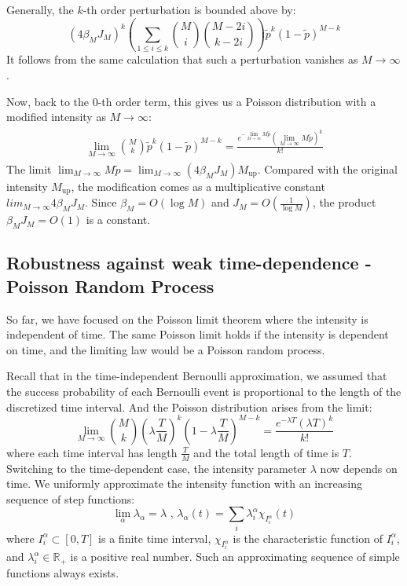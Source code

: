 \documentclass[a4paper,11pt]{article}
\theoremstyle{definition}
\numberwithin{equation}{section}
\begin{document}
Generally, the $k$-th order perturbation is bounded above by:
\begin{equation}
    (4\beta_M J_M)^k(\sum_{1\leq i\leq k}\binom{M}{i}\binom{M- 2i}{k - 2i})\widetilde{p}^k(1 - \widetilde{p})^{M - k}
\end{equation}
It follows from the same calculation that such a perturbation vanishes as $M\rightarrow\infty$.

Now, back to the $0$-th order term, this gives us a Poisson distribution with a modified intensity as $M\rightarrow\infty$:
\begin{align}
    \begin{split}
        \lim_{M\rightarrow\infty}\binom{M}{k}\widetilde{p}^k(1 - \widetilde{p})^{M - k} = \frac{e^{-\lim_{M\rightarrow\infty}M\widetilde{p}}(\lim_{M\rightarrow\infty}M\widetilde{p})^k}{k!}
    \end{split}
\end{align}
The limit $\lim_{M\rightarrow \infty}M\widetilde{p} = \lim_{M\rightarrow\infty}(4\beta_M J_M)M_\text{up}$. Compared with the original intensity $M_\text{up}$, the modification comes as a multiplicative constant $lim_{M\rightarrow\infty}4\beta_M J_M$. Since $\beta_M = O(\log M)$ and $J_M = O(\frac{1}{\log M})$, the product $\beta_M J_M = O(1)$ is a constant.
\subsection{Robustness against weak time-dependence - Poisson Random Process}
So far, we have focused on the Poisson limit theorem where the intensity is independent of time. The same Poisson limit holds if the intensity is dependent on time, and the limiting law would be a Poisson random process.

Recall that in the time-independent Bernoulli approximation, we assumed that the success probability of each Bernoulli event is proportional to the length of the discretized time interval. And the Poisson distribution arises from the limit:
\begin{equation}
    \lim_{M\rightarrow\infty}\binom{M}{k}(\lambda\frac{T}{M})^k(1 - \lambda\frac{T}{M})^{M-k} = \frac{e^{-\lambda T}(\lambda T)^k}{k!}
\end{equation}
where each time interval has length $\frac{T}{M}$ and the total length of time is $T$. Switching to the time-dependent case, the intensity parameter $\lambda$ now depends on time. We uniformly approximate the intensity function with an increasing sequence of step functions:
\begin{equation}
    \lim_{\alpha}\lambda_\alpha = \lambda\text{ , }\lambda_\alpha(t) = \sum_{i}\lambda^\alpha_i\chi_{I_i^\alpha}(t)
\end{equation}
where $I_i^\alpha\subset[0,T]$ is a finite time interval, $\chi_{I^\alpha_i}$ is the characteristic function of $I_i^\alpha$, and $\lambda_i^\alpha\in\mathbb{R}_+$ is a positive real number. Such an approximating sequence of simple functions always exists. 
\end{document}
